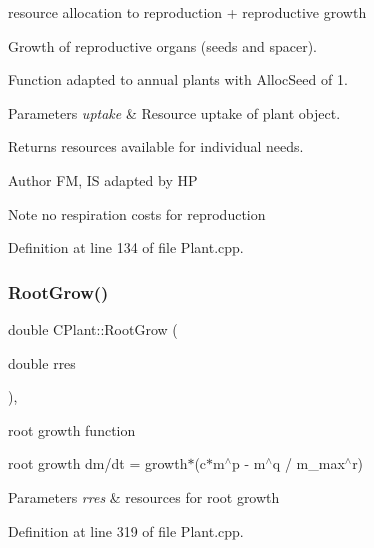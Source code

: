 resource allocation to reproduction + reproductive growth 

Growth of reproductive organs (seeds and spacer).

Function adapted to annual plants with Alloc\+Seed of 1. 
\begin{DoxyParams}{Parameters}
{\em uptake} & Resource uptake of plant object. \\
\hline
\end{DoxyParams}
\begin{DoxyReturn}{Returns}
resources available for individual needs. 
\end{DoxyReturn}
\begin{DoxyAuthor}{Author}
FM, IS adapted by HP 
\end{DoxyAuthor}
\begin{DoxyNote}{Note}
no \textquotesingle{}respiration\textquotesingle{} costs for reproduction 
\end{DoxyNote}


Definition at line 134 of file Plant.\+cpp.

\mbox{\label{class_c_plant_a724f5a844253dac46311e85e37cc46fd}} 
\subsubsection{\texorpdfstring{RootGrow()}{RootGrow()}}
{\footnotesize\ttfamily double C\+Plant\+::\+Root\+Grow (\begin{DoxyParamCaption}\item[{double}]{rres }\end{DoxyParamCaption})\hspace{0.3cm}{\ttfamily [protected]}, {\ttfamily [virtual]}}



root growth function 

root growth dm/dt = growth$\ast$(c$\ast$m$^\wedge$p -\/ m$^\wedge$q / m\+\_\+max$^\wedge$r) 
\begin{DoxyParams}{Parameters}
{\em rres} & resources for root growth \\
\hline
\end{DoxyParams}


Definition at line 319 of file Plant.\+cpp.

\mbox{\label{class_c_plant_a8e9f7d1261306165ecca0cf951f50505}} 
